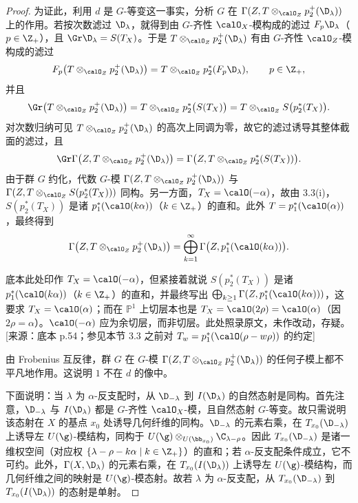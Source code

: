 \begin{proof}
为证此，利用 $d$ 是 $G$-等变这一事实，分析 $G$ 在 $\Gamma(Z,T\otimes_{\calO_Z}p_2^+(\D_\lambda))$ 上的作用。若按次数滤过 $\D_\lambda$，就得到由 $G$-齐性 $\calO_X$-模构成的滤过 $F_p\D_\lambda$（$p\in\Z_+$），且 $\Gr\D_\lambda=S(T_X)$。于是 $T\otimes_{\calO_Z}p_2^+(\D_\lambda)$ 有由 $G$-齐性 $\calO_Z$-模构成的滤过
$$F_p\bigl(T\otimes_{\calO_Z}p_2^+(\D_\lambda)\bigr)=T\otimes_{\calO_Z}p_2^*(F_p\D_\lambda),\qquad p\in\Z_+,$$
并且
$$\Gr\bigl(T\otimes_{\calO_Z}p_2^+(\D_\lambda)\bigr)=T\otimes_{\calO_Z}p_2^*\bigl(S(T_X)\bigr)=T\otimes_{\calO_Z}S\bigl(p_2^*(T_X)\bigr).$$
对次数归纳可见 $T\otimes_{\calO_Z}p_2^+(\D_\lambda)$ 的高次上同调为零，故它的滤过诱导其整体截面的滤过，且
$$\Gr\Gamma\bigl(Z,T\otimes_{\calO_Z}p_2^+(\D_\lambda)\bigr)=\Gamma\bigl(Z,T\otimes_{\calO_Z}p_2^*(S(T_X))\bigr).$$
由于群 $G$ 约化，代数 $G$-模 $\Gamma(Z,T\otimes_{\calO_Z}p_2^+(\D_\lambda))$ 与 $\Gamma(Z,T\otimes_{\calO_Z}S(p_2^*(T_X)))$ 同构。另一方面，$T_X=\calO(-\alpha)$，故由 3.3(i)，$S(p_2^*(T_X))$ 是诸 $p_1^*(\calO(k\alpha))$（$k\in\Z_+$）的直和。此外 $T=p_1^*(\calO(\alpha))$，最终得到
$$\Gamma\bigl(Z,T\otimes_{\calO_Z}p_2^+(\D_\lambda)\bigr)=\bigoplus_{k=1}^{\infty}\Gamma\bigl(Z,p_1^*(\calO(k\alpha))\bigr).$$
\begin{annote}
底本此处印作 $T_X=\calO(-\alpha)$，但紧接着就说 $S(p_2^*(T_X))$ 是诸 $p_1^*(\calO(k\alpha))$（$k\in\Z_+$）的直和，并最终写出 $\bigoplus_{k\ge1}\Gamma(Z,p_1^*(\calO(k\alpha)))$，这要求 $T_X=\calO(\alpha)$；而在 $\mathbb{P}^1$ 上切层本也是 $T_X=\calO(2\rho)=\calO(\alpha)$（因 $2\rho=\alpha$）。$\calO(-\alpha)$ 应为余切层，而非切层。此处照录原文，未作改动，存疑。[来源：底本 p.54；参见本节 3.3 之前对 $T_w=p_1^*(\calO(\rho-w\rho))$ 的约定]
\end{annote}
由 Frobenius 互反律，群 $G$ 在 $G$-模 $\Gamma(Z,T\otimes_{\calO_Z}p_2^+(\D_\lambda))$ 的任何子模上都不平凡地作用。这说明 $1$ 不在 $d$ 的像中。

下面说明：当 $\lambda$ 为 $\alpha$-反支配时，从 $\D_{-\lambda}$ 到 $I(\D_\lambda)$ 的自然态射是同构。首先注意，$\D_{-\lambda}$ 与 $I(\D_\lambda)$ 都是 $G$-齐性 $\calO_X$-模，且自然态射 $G$-等变。故只需说明该态射在 $X$ 的基点 $x_0$ 处诱导几何纤维的同构。$\D_{-\lambda}$ 的元素右乘，在 $T_{x_0}(\D_{-\lambda})$ 上诱导左 $U(\g)$-模结构，同构于 $U(\g)\otimes_{U(\bb_{x_0})}\C_{\lambda-\rho}$。因此 $T_{x_0}(\D_{-\lambda})$ 是诸一维权空间（对应权 $\{\lambda-\rho-k\alpha\mid k\in\Z_+\}$）的直和；若 $\alpha$-反支配条件成立，它不可约。此外，$\Gamma(X,\D_\lambda)$ 的元素右乘，在 $T_{x_0}(I(\D_\lambda))$ 上诱导左 $U(\g)$-模结构，而几何纤维之间的映射是 $U(\g)$-模态射。故若 $\lambda$ 为 $\alpha$-反支配，从 $T_{x_0}(\D_{-\lambda})$ 到 $T_{x_0}(I(\D_\lambda))$ 的态射是单射。


\end{proof}
